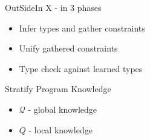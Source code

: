 \documentclass{beamer}
\begin{document}
\begin{frame}{OutSideIn X - in 3 phases}
\begin{itemize}
\item Infer types and gather constraints
\item Unify gathered constraints
\item Type check against learned types
\end{itemize}
\end{frame}

\begin{frame}{Stratify Program Knowledge}
\begin{itemize}
\item $\mathcal{Q}$ - global knowledge
\item $Q$ - local knowledge
\end{itemize}
\end{frame}
\end{document}
